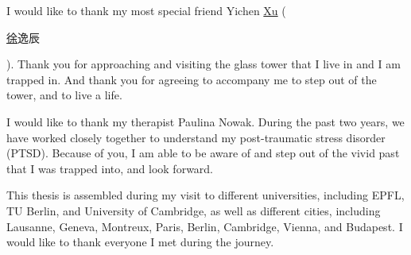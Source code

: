 \documentclass[phd,icsa,twoside,logo]{infthesis}
\begin{document}
\begin{preliminary}
\begin{acknowledgements}
I would like to thank my most special friend Yichen \underline{Xu} (\begin{CJK*}{UTF8}{gbsn}\underline{徐}逸辰\end{CJK*}). Thank you for approaching and visiting the glass tower that I live in and I am trapped in. And thank you for agreeing to accompany me to step out of the tower, and to live a life.

I would like to thank my therapist Paulina Nowak. During the past two years, we have worked closely together to understand my post-traumatic stress disorder (PTSD). Because of you, I am able to be aware of and step out of the vivid past that I was trapped into, and look forward.

This thesis is assembled during my visit to different universities, including EPFL, TU Berlin, and University of Cambridge, as well as different cities, including Lausanne, Geneva, Montreux, Paris, Berlin, Cambridge, Vienna, and Budapest. I would like to thank everyone I met during the journey.


\end{acknowledgements}

\extendedstandarddeclaration


\tableofcontents


\end{preliminary}







% 

\appendix







\end{document}
